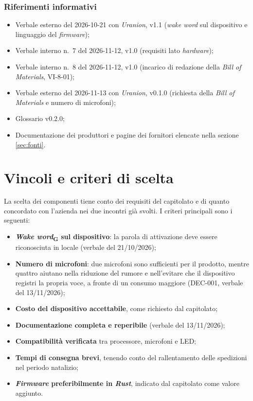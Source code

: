 \documentclass[12pt,a4paper]{article}
\newcommand{\gl}[1]{\emph{#1}\textsubscript{\scriptsize G}}
\newcommand{\tightlist}{\setlength{\itemsep}{1pt}\setlength{\parskip}{0pt}}
\begin{document}
\subsubsection{Riferimenti informativi}
\begin{itemize}
\tightlist
\item Verbale esterno del 2026-10-21 con \emph{Uranion}, v1.1 (\emph{wake word} sul dispositivo e linguaggio del \emph{firmware});
\item Verbale interno n.\ 7 del 2026-11-12, v1.0 (requisiti lato \emph{hardware});
\item Verbale interno n.\ 8 del 2026-11-12, v1.0 (incarico di redazione della \emph{Bill of Materials}, VI-8-01);
\item Verbale esterno del 2026-11-13 con \emph{Uranion}, v0.1.0 (richiesta della \emph{Bill of Materials} e numero di microfoni);
\item Glossario v0.2.0;
\item Documentazione dei produttori e pagine dei fornitori elencate nella sezione \ref{sec:fonti}.
\end{itemize}

\section{Vincoli e criteri di scelta}

La scelta dei componenti tiene conto dei requisiti del capitolato e di quanto concordato con l'azienda nei due incontri già svolti. I criteri principali sono i seguenti:

\begin{itemize}
\tightlist
\item \textbf{\gl{Wake word} sul dispositivo}: la parola di attivazione deve essere riconosciuta in locale (verbale del 21/10/2026);
\item \textbf{Numero di microfoni}: due microfoni sono sufficienti per il prodotto, mentre quattro aiutano nella riduzione del rumore e nell'evitare che il dispositivo registri la propria voce, a fronte di un consumo maggiore (DEC-001, verbale del 13/11/2026);
\item \textbf{Costo del dispositivo accettabile}, come richiesto dal capitolato;
\item \textbf{Documentazione completa e reperibile}  (verbale del 13/11/2026);
\item \textbf{Compatibilità verificata} tra processore, microfoni e LED;
\item \textbf{Tempi di consegna brevi}, tenendo conto del rallentamento delle spedizioni nel periodo natalizio;
\item \textbf{\emph{Firmware} preferibilmente in \emph{Rust}}, indicato dal capitolato come valore aggiunto.
\end{itemize}
\end{document}
